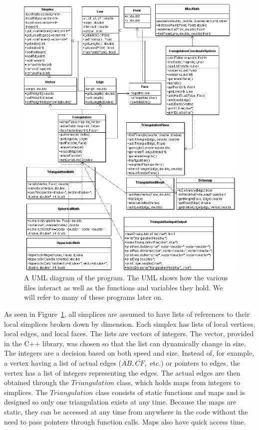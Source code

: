 \documentclass[12pt]{article}
\begin{document}
\begin{figure}
\begin{center}
\includegraphics[scale = 0.47]{Pictures/triangulationUML.png}
\end{center}
\caption{A UML diagram of the program. The UML shows how the various files interact as well as the functions and variables they hold. We will refer to many of these programs later on.}
\label{triUML}
\end{figure}

 As seen in Figure~\ref{triUML}, all simplices are assumed to have lists of references to their local simplices broken down by dimension. Each simplex has lists of local vertices, local edges, and local faces. The lists are vectors of integers. The vector, provided in the C++ library, was chosen so that the list can dynamically change in size. The integers are a decision based on both speed and size. Instead of, for example, a vertex having a list of actual edges ($\overline{AB}, \overline{CF},$ etc.) or pointers to edges, the vertex has a list of integers representing the edges. The actual edges are then obtained through the $Triangulation$ class, which holds maps from integers to simplices. The $Triangulation$ class consists of static functions and maps and is designed so only one triangulation exists at any time. Because the maps are static, they can be accessed at any time from anywhere in the code without the need to pass pointers through function calls. Maps also have quick access time.
\end{document}
